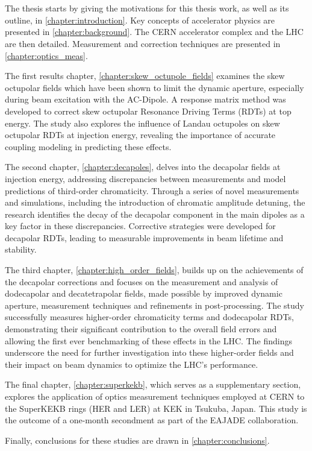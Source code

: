 \section{}

The thesis starts by giving the motivations for this thesis work, as well as its outline, in
\cref{chapter:introduction}. Key concepts of accelerator physics are presented in
\cref{chapter:background}. The CERN accelerator complex and the LHC are then detailed. Measurement
and correction techniques are presented in \cref{chapter:optics_meas}.

The first results chapter, \cref{chapter:skew_octupole_fields} examines the skew octupolar fields
which have been shown to limit the dynamic aperture, especially during beam excitation with the
AC-Dipole. A response matrix method was developed to correct skew octupolar Resonance Driving Terms
(RDTs) at top energy. The study also explores the influence of Landau octupoles on skew octupolar
RDTs at injection energy, revealing the importance of accurate coupling modeling in predicting these
effects.

The second chapter, \cref{chapter:decapoles}, delves into the decapolar fields at injection energy,
addressing discrepancies between measurements and model predictions of third-order chromaticity.
Through a series of novel measurements and simulations, including the introduction of chromatic
amplitude detuning, the research identifies the decay of the decapolar component in the main dipoles
as a key factor in these discrepancies. Corrective strategies were developed for decapolar RDTs,
leading to measurable improvements in beam lifetime and stability.

The third chapter, \cref{chapter:high_order_fields}, builds up on the achievements of the decapolar
corrections and focuses on the measurement and analysis of dodecapolar and decatetrapolar fields,
made possible by improved dynamic aperture, measurement techniques and refinements in 
post-processing.
The study successfully measures higher-order chromaticity terms and dodecapolar RDTs, demonstrating
their significant contribution to the overall field errors and allowing the first ever benchmarking
of these effects in the LHC. The findings underscore the need for further investigation into these
higher-order fields and their impact on beam dynamics to optimize the LHC's performance.

The final chapter, \cref{chapter:superkekb}, which serves as a supplementary section, explores the
application of optics measurement techniques employed at CERN to the SuperKEKB rings (HER and LER)
at KEK in Tsukuba, Japan. This study is the outcome of a one-month secondment as part of the EAJADE
collaboration.

Finally, conclusions for these studies are drawn in \cref{chapter:conclusions}.